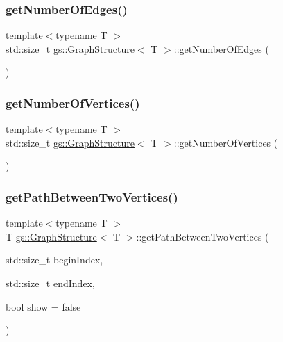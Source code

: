 \mbox{\label{classgs_1_1_graph_structure_ab7f63de5d83e392689eb9e10f776c848}} 
\subsubsection{\texorpdfstring{get\+Number\+Of\+Edges()}{getNumberOfEdges()}}
{\footnotesize\ttfamily template$<$typename T $>$ \\
std\+::size\+\_\+t \mbox{\hyperlink{classgs_1_1_graph_structure}{gs\+::\+Graph\+Structure}}$<$ T $>$\+::get\+Number\+Of\+Edges (\begin{DoxyParamCaption}{ }\end{DoxyParamCaption})}

\mbox{\label{classgs_1_1_graph_structure_a973bb790243cd98bceac6188a79f47d6}} 
\subsubsection{\texorpdfstring{get\+Number\+Of\+Vertices()}{getNumberOfVertices()}}
{\footnotesize\ttfamily template$<$typename T $>$ \\
std\+::size\+\_\+t \mbox{\hyperlink{classgs_1_1_graph_structure}{gs\+::\+Graph\+Structure}}$<$ T $>$\+::get\+Number\+Of\+Vertices (\begin{DoxyParamCaption}{ }\end{DoxyParamCaption})}

\mbox{\label{classgs_1_1_graph_structure_ac144d278d9b8a2d1bf0c4b59c0146348}} 
\subsubsection{\texorpdfstring{get\+Path\+Between\+Two\+Vertices()}{getPathBetweenTwoVertices()}}
{\footnotesize\ttfamily template$<$typename T $>$ \\
T \mbox{\hyperlink{classgs_1_1_graph_structure}{gs\+::\+Graph\+Structure}}$<$ T $>$\+::get\+Path\+Between\+Two\+Vertices (\begin{DoxyParamCaption}\item[{std\+::size\+\_\+t}]{begin\+Index,  }\item[{std\+::size\+\_\+t}]{end\+Index,  }\item[{bool}]{show = {\ttfamily false} }\end{DoxyParamCaption})}

